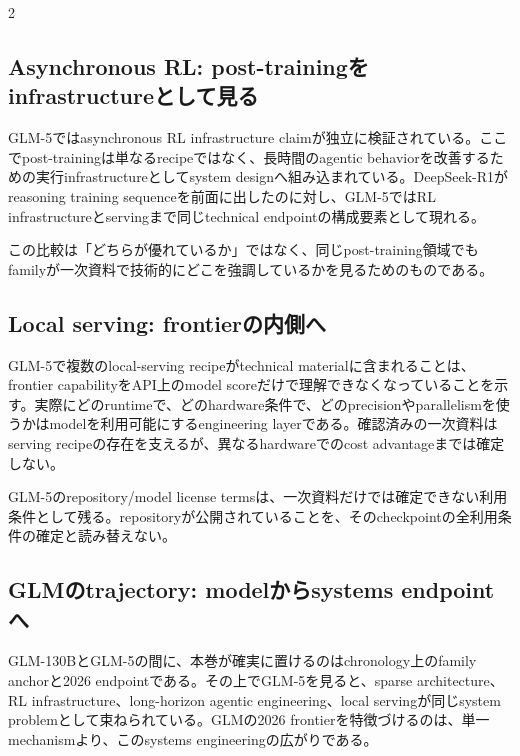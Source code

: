\documentclass[lualatex,a4paper,10pt]{jlreq}
\begin{document}
\begin{multicols}{2}
\subsection{Asynchronous RL: post-trainingをinfrastructureとして見る}
GLM-5ではasynchronous RL infrastructure claimが独立に検証されている。ここでpost-trainingは単なるrecipeではなく、長時間のagentic behaviorを改善するための実行infrastructureとしてsystem designへ組み込まれている。DeepSeek-R1がreasoning training sequenceを前面に出したのに対し、GLM-5ではRL infrastructureとservingまで同じtechnical endpointの構成要素として現れる。\autocite{glm5,deepseekr1}

この比較は「どちらが優れているか」ではなく、同じpost-training領域でもfamilyが一次資料で技術的にどこを強調しているかを見るためのものである。

\subsection{Local serving: frontierの内側へ}
GLM-5で複数のlocal-serving recipeがtechnical materialに含まれることは、frontier capabilityをAPI上のmodel scoreだけで理解できなくなっていることを示す。実際にどのruntimeで、どのhardware条件で、どのprecisionやparallelismを使うかはmodelを利用可能にするengineering layerである。確認済みの一次資料はserving recipeの存在を支えるが、異なるhardwareでのcost advantageまでは確定しない。\autocite{glm5}

GLM-5のrepository/model license termsは、一次資料だけでは確定できない利用条件として残る。repositoryが公開されていることを、そのcheckpointの全利用条件の確定と読み替えない。

\subsection{GLMのtrajectory: modelからsystems endpointへ}
GLM-130BとGLM-5の間に、本巻が確実に置けるのはchronology上のfamily anchorと2026 endpointである。その上でGLM-5を見ると、sparse architecture、RL infrastructure、long-horizon agentic engineering、local servingが同じsystem problemとして束ねられている。GLMの2026 frontierを特徴づけるのは、単一mechanismより、このsystems engineeringの広がりである。

\end{multicols}

\end{document}
